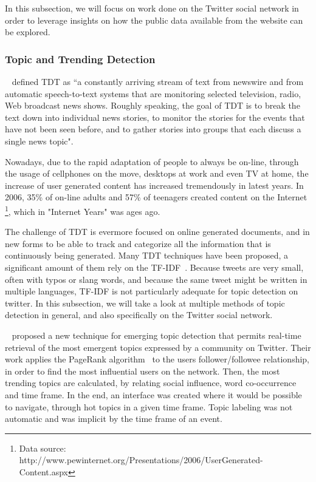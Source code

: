 \documentclass[journal]{IEEEtran}
\begin{document}
In this subsection, we will focus on work done on the Twitter social network in order to leverage insights on how the public data available from the website can be explored. 

\subsubsection{Topic and Trending Detection} 
\label{sub:real_time_topic_and_trending_detection}

~\citet{allan2002topic} defined \ac{TDT} as “a constantly arriving stream of text from newswire and from automatic speech-to-text systems that are monitoring selected television, radio, Web broadcast news shows. Roughly speaking, the goal of \ac{TDT} is to break the text down into individual news stories, to monitor the stories for the events that have not been seen before, and to gather stories into groups that each discuss a single news topic".

Nowadays, due to the rapid adaptation of people to always be on-line, through the usage of cellphones on the move, desktops at work and even TV at home, the increase of user generated content has increased tremendously in latest years. In 2006, 35\% of on-line adults and 57\% of teenagers created content on the Internet \footnote{ Data source: http://www.pewinternet.org/Presentations/2006/UserGenerated-Content.aspx}, which in "Internet Years" was ages ago. 

The challenge of \ac{TDT} is evermore focused on online generated documents, and in new forms to be able to track and categorize all the information that is continuously being generated.
Many \ac{TDT} techniques have been proposed,  a significant amount of them rely on the \ac{TF-IDF}~\cite{Baeza-Yates:1999:MIR:553876}. Because tweets are very small, often with typos or slang words, and because the same tweet might be written in multiple languages, \ac{TF-IDF} is not particularly adequate for topic detection on twitter. In this subsection, we will take a look at multiple methods of topic detection in general, and also specifically on the Twitter social network.

~\citet{Cataldi2010} proposed a new technique for emerging topic detection that permits real-time retrieval of the most emergent topics expressed by a community on Twitter. Their work applies the PageRank algorithm~\cite{Pagerank1998} to the users follower/followee relationship, in order to find the most influential users on the network. Then, the most trending topics are calculated, by relating social influence, word co-occurrence and time frame. In the end, an interface was created where it would be possible to navigate, through hot topics in a given time frame. Topic labeling was not automatic and was implicit by the time frame of an event.
\end{document}
